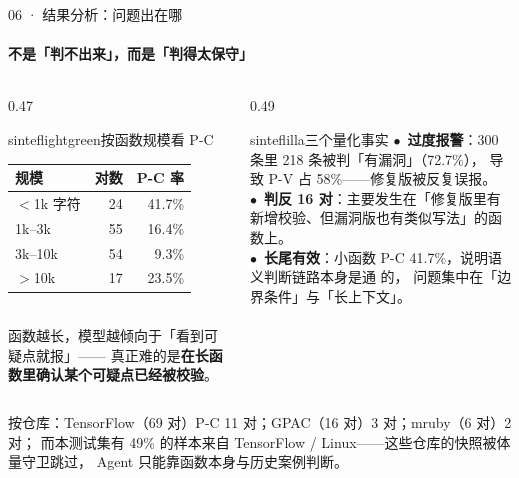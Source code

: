 \documentclass{beamer}
\newcommand{\good}{\textcolor{sintefgreen}{$\bullet$}}
\newcommand{\warn}{\textcolor{sintefyellow}{$\bullet$}}
\newcommand{\bad}{\textcolor{sinteflilla}{$\bullet$}}
\begin{document}
\begin{frame}{06 · 结果分析：问题出在哪}
\framesubtitle{不是「判不出来」，而是「判得太保守」}
\footnotesize
\begin{columns}[t]
\begin{column}{0.47\textwidth}
\begin{colorblock}[black]{sinteflightgreen}{按函数规模看 P-C}
\scriptsize
\begin{tabular}{@{}lrr@{}}
\toprule
\textbf{规模} & \textbf{对数} & \textbf{P-C 率} \\
\midrule
$<$1k 字符 & 24 & 41.7\% \\
1k--3k & 55 & 16.4\% \\
3k--10k & 54 & 9.3\% \\
$>$10k & 17 & 23.5\% \\
\bottomrule
\end{tabular}\\[0.4em]
函数越长，模型越倾向于「看到可疑点就报」——
真正难的是\textbf{在长函数里确认某个可疑点已经被校验}。
\end{colorblock}
\end{column}
\begin{column}{0.49\textwidth}
\begin{colorblock}[black]{sinteflilla}{三个量化事实}
\scriptsize
\bad\ \textbf{过度报警}：300 条里 218 条被判「有漏洞」（72.7\%），
导致 P-V 占 58\%——修复版被反复误报。\\[0.3em]
\warn\ \textbf{判反 16 对}：主要发生在「修复版里有新增校验、但漏洞版也有类似写法」的函数上。\\[0.3em]
\good\ \textbf{长尾有效}：小函数 P-C 41.7\%，说明语义判断链路本身是通 的，
问题集中在「边界条件」与「长上下文」。
\end{colorblock}
\end{column}
\end{columns}

\vspace{0.3em}
\begin{center}
\footnotesize
按仓库：TensorFlow（69 对）P-C 11 对；GPAC（16 对）3 对；mruby（6 对）2 对；
而本测试集有 \alert{49\%} 的样本来自 TensorFlow / Linux——这些仓库的快照被体量守卫跳过，
Agent 只能靠函数本身与历史案例判断。
\end{center}
\end{frame}
\end{document}
